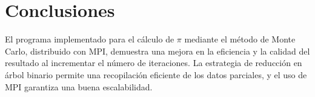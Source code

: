 \documentclass[conference, a4paper]{IEEEtran}
\begin{document}
\section{Conclusiones}
El programa implementado para el cálculo de \(\pi\) mediante el método de Monte Carlo, distribuido con MPI, demuestra una mejora en la eficiencia y la calidad del resultado al incrementar el número de iteraciones. La estrategia de reducción en árbol binario permite una recopilación eficiente de los datos parciales, y el uso de MPI garantiza una buena escalabilidad.




\end{document}
